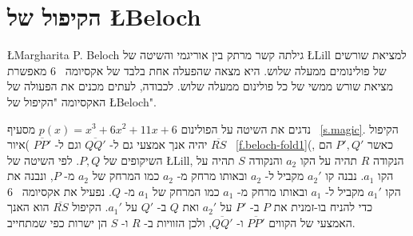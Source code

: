 \section{%
הקיפול של
\L{Beloch}}\label{s.beloch-fold}

\L{Margharita P. Beloch}
גילתה קשר מרתק בין אוריגמי והשיטה של
\L{Lill}
למציאת שורשים של פולינומים ממעלה שלוש. היא מצאה שהפעלה אחת בלבד של אקסיומה%
~$6$
מאפשרת מציאת שורש ממשי של כל פולינום ממעלה שלוש. לכבודה, לעתים מכנים את הפעולה של האקסיומה "הקיפול של
\L{Beloch}".

נדגים את השיטה על הפולינום
$p(x)=x^3+6x^2+11x+6$
מסעיף%
~\ref{s.magic}.
הקיפול
$\overline{RS}$
יהיה אנך אמצעי גם ל-%
$\overline{QQ'}$
וגם ל-%
$\overline{PP'}$
)איור~%
\ref{f.beloch-fold1}(,
כאשר 
$P',Q'$
הם השיקופים של
$P,Q$.
לפי השיטה של
\L{Lill},
הנקודה
$R$
תהיה על הקו
$a_2$
והנקודה
$S$
תהיה על הקו
$a_1$.
נבנה קו
$a_2'$
מקביל ל-%
$a_2$
ובאותו מרחק מ-%
$a_2$
כמו המרחק של
$a_2$
מ-%
$P$,
ונבנה את הקו
$a_1'$
מקביל ל-%
$a_1$
ובאותו מרחק מ-%
$a_1$
כמו המרחק של
$a_1$
מ-%
$Q$.
נפעיל את אקסיומה%
~$6$
כדי להניח בו-זמנית את 
$P$
ב-%
$P'$
על 
$a_2'$
ואת 
$Q$
ב-%
$Q'$
על
$a_1'$.
הקיפול 
$\overline{RS}$
הוא האנך האמצעי של הקווים
$\overline{PP'}$
ו-%
$\overline{QQ'}$,
ולכן הזוויות ב-%
$R$
ו-%
$S$
הן ישרות כפי שמתחייב.



